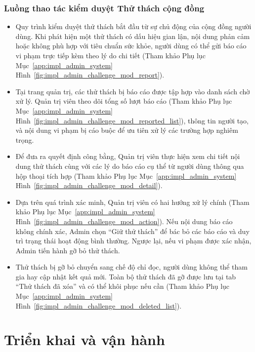 \subsubsection{Luồng thao tác kiểm duyệt Thử thách cộng đồng}
\begin{itemize}
    \item Quy trình kiểm duyệt thử thách bắt đầu từ sự chủ động của cộng đồng người dùng. Khi phát hiện một thử thách có dấu hiệu gian lận, nội dung phản cảm hoặc không phù hợp với tiêu chuẩn sức khỏe, người dùng có thể gửi báo cáo vi phạm trực tiếp kèm theo lý do chi tiết (Tham khảo Phụ lục Mục~\ref{app:impl_admin_system} Hình~\ref{fig:impl_admin_challenge_mod_report}).


    \item Tại trang quản trị, các thử thách bị báo cáo được tập hợp vào danh sách chờ xử lý. Quản trị viên theo dõi tổng số lượt báo cáo (Tham khảo Phụ lục Mục~\ref{app:impl_admin_system} Hình~\ref{fig:impl_admin_challenge_mod_reported_list}), thông tin người tạo, và nội dung vi phạm bị cáo buộc để ưu tiên xử lý các trường hợp nghiêm trọng.


    \item Để đưa ra quyết định công bằng, Quản trị viên thực hiện xem chi tiết nội dung thử thách cùng với các lý do báo cáo cụ thể từ người dùng thông qua hộp thoại tích hợp (Tham khảo Phụ lục Mục~\ref{app:impl_admin_system} Hình~\ref{fig:impl_admin_challenge_mod_detail}).


    \item Dựa trên quá trình xác minh, Quản trị viên có hai hướng xử lý chính (Tham khảo Phụ lục Mục~\ref{app:impl_admin_system} Hình~\ref{fig:impl_admin_challenge_mod_action}). Nếu nội dung báo cáo không chính xác, Admin chọn ``Giữ thử thách'' để bác bỏ các báo cáo và duy trì trạng thái hoạt động bình thường. Ngược lại, nếu vi phạm được xác nhận, Admin tiến hành gỡ bỏ thử thách.


    \item Thử thách bị gỡ bỏ chuyển sang chế độ chỉ đọc, người dùng không thể tham gia hay cập nhật kết quả mới. Toàn bộ thử thách đã gỡ được lưu tại tab ``Thử thách đã xóa'' và có thể khôi phục nếu cần (Tham khảo Phụ lục Mục~\ref{app:impl_admin_system} Hình~\ref{fig:impl_admin_challenge_mod_deleted_list}).

\end{itemize}


\section{Triển khai và vận hành}
\label{sec:deployment_operation}

